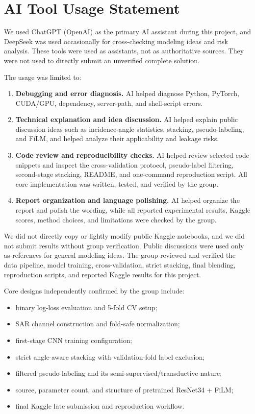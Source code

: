 \documentclass[11pt]{article}
\begin{document}
\section{AI Tool Usage Statement}

We used ChatGPT (OpenAI) as the primary AI assistant during this project, and DeepSeek was used occasionally for cross-checking modeling ideas and risk analysis. These tools were used as assistants, not as authoritative sources. They were not used to directly submit an unverified complete solution.

The usage was limited to:

\begin{enumerate}
  \item \textbf{Debugging and error diagnosis.} AI helped diagnose Python, PyTorch, CUDA/GPU, dependency, server-path, and shell-script errors.
  \item \textbf{Technical explanation and idea discussion.} AI helped explain public discussion ideas such as incidence-angle statistics, stacking, pseudo-labeling, and FiLM, and helped analyze their applicability and leakage risks.
  \item \textbf{Code review and reproducibility checks.} AI helped review selected code snippets and inspect the cross-validation protocol, pseudo-label filtering, second-stage stacking, README, and one-command reproduction script. All core implementation was written, tested, and verified by the group.
  \item \textbf{Report organization and language polishing.} AI helped organize the report and polish the wording, while all reported experimental results, Kaggle scores, method choices, and limitations were checked by the group.
\end{enumerate}

We did not directly copy or lightly modify public Kaggle notebooks, and we did not submit results without group verification. Public discussions were used only as references for general modeling ideas. The group reviewed and verified the data pipeline, model training, cross-validation, strict stacking, final blending, reproduction scripts, and reported Kaggle results for this project.

Core designs independently confirmed by the group include:

\begin{itemize}
  \item binary log-loss evaluation and 5-fold CV setup;
  \item SAR channel construction and fold-safe normalization;
  \item first-stage CNN training configuration;
  \item strict angle-aware stacking with validation-fold label exclusion;
  \item filtered pseudo-labeling and its semi-supervised/transductive nature;
  \item source, parameter count, and structure of pretrained ResNet34 + FiLM;
  \item final Kaggle late submission and reproduction workflow.
\end{itemize}
\end{document}
